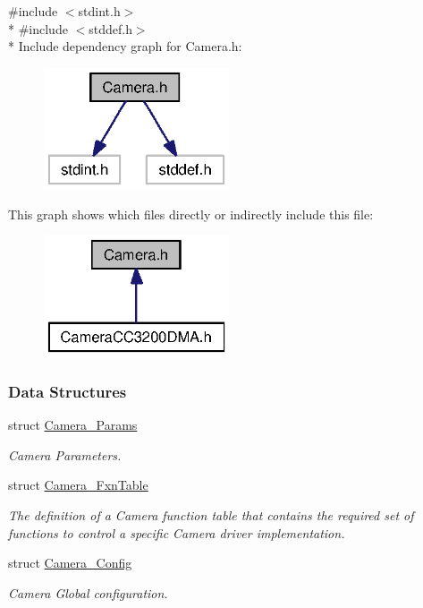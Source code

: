 {\ttfamily \#include $<$stdint.\+h$>$}\\*
{\ttfamily \#include $<$stddef.\+h$>$}\\*
Include dependency graph for Camera.\+h\+:
\nopagebreak
\begin{figure}[H]
\begin{center}
\leavevmode
\includegraphics[width=155pt]{_camera_8h__incl}
\end{center}
\end{figure}
This graph shows which files directly or indirectly include this file\+:
\nopagebreak
\begin{figure}[H]
\begin{center}
\leavevmode
\includegraphics[width=155pt]{_camera_8h__dep__incl}
\end{center}
\end{figure}
\subsubsection*{Data Structures}
\begin{DoxyCompactItemize}
\item 
struct \hyperlink{struct_camera___params}{Camera\+\_\+\+Params}
\begin{DoxyCompactList}\small\item\em Camera Parameters. \end{DoxyCompactList}\item 
struct \hyperlink{struct_camera___fxn_table}{Camera\+\_\+\+Fxn\+Table}
\begin{DoxyCompactList}\small\item\em The definition of a Camera function table that contains the required set of functions to control a specific Camera driver implementation. \end{DoxyCompactList}\item 
struct \hyperlink{struct_camera___config}{Camera\+\_\+\+Config}
\begin{DoxyCompactList}\small\item\em Camera Global configuration. \end{DoxyCompactList}\end{DoxyCompactItemize}
